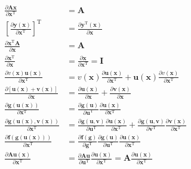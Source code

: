 \documentclass[UTF8,space=auto]{ctexart} %
\begin{document}
\begin{align}
\frac{\partial \mathbf{A} \mathbf{x}}{\partial \mathbf{x}^{\mathrm{T}}} &= \mathbf{A} \\
\left[\frac{\partial \mathbf{y}(\mathbf{x})}{\partial \mathbf{x}^{\mathrm{T}}}\right]^{\mathrm{T}} &= \frac{\partial \mathbf{y}^{\mathrm{T}}(\mathbf{x})}{\partial \mathbf{x}} \\
\frac{\partial \mathbf{x}^{\mathrm{T}} \mathbf{A}}{\partial \mathbf{x}} &= \mathbf{A} \\
\frac{\partial \mathbf{x}^{\mathrm{T}}}{\partial \mathbf{x}} &= \frac{\partial \mathbf{x}}{\partial \mathbf{x}^{\mathrm{T}}} = \mathbf{I} \\
\frac{\partial v(\mathbf{x}) \mathbf{u}(\mathbf{x})}{\partial \mathbf{x}^{\mathrm{T}}} &= v(\mathbf{x}) \frac{\partial \mathbf{u}(\mathbf{x})}{\partial \mathbf{x}^{\mathrm{T}}}+\mathbf{u}(\mathbf{x}) \frac{\partial v(\mathbf{x})}{\partial \mathbf{x}^{\mathrm{T}}} \\
\frac{ \partial \left[ \mathbf{u}(\mathbf{x})+\mathbf{v}(\mathbf{x}) \right] }{\partial \mathbf{x}} &= \frac{\partial \mathbf{u}(\mathbf{x})}{\partial \mathbf{x}}+\frac{\partial \mathbf{v}(\mathbf{x})}{\partial \mathbf{x}} \\
\frac{\partial \mathbf{g}(\mathbf{u}(\mathbf{x}))}{\partial \mathbf{x}^{\mathrm{T}}} &= \frac{\partial \mathbf{g}(\mathbf{u})}{\partial \mathbf{u}^{\mathrm{T}}} \frac{\partial \mathbf{u}(\mathbf{x})}{\partial \mathbf{x}^{\mathrm{T}}} \\
\frac{\partial \mathbf{g}(\mathbf{u}(\mathbf{x}), \mathbf{v}(\mathbf{x}))}{\partial \mathbf{x}^{\mathrm{T}}}&=\frac{\partial \mathbf{g}(\mathbf{u}, \mathbf{v})}{\partial \mathbf{u}^{\mathrm{T}}} \frac{\partial \mathbf{u}(\mathbf{x})}{\partial \mathbf{x}^{\mathrm{T}}}+\frac{\partial \mathbf{g}(\mathbf{u}, \mathbf{v})}{\partial \mathbf{v}^{\mathrm{T}}} \frac{\partial \mathbf{v}(\mathbf{x})}{\partial \mathbf{x}^{\mathrm{T}}} \\
\frac{\partial \bm{f}(\mathbf{g}(\mathbf{u}(\mathbf{x})))}{\partial \mathbf{x}^{\mathrm{T}}}&=\frac{\partial \bm{f}(\mathbf{g})}{\partial \mathbf{g}^{\mathrm{T}}} \frac{\partial \mathbf{g}(\mathbf{u})}{\partial \mathbf{u}^{\mathrm{T}}} \frac{\partial \mathbf{u}(\mathbf{x})}{\partial \mathbf{x}^{\mathrm{T}}} \\
\frac{\partial \mathbf{A} \mathbf{u}(\mathbf{x})}{\partial \mathbf{x}^{\mathrm{T}}}&=\frac{\partial \mathbf{A} \mathbf{u}}{\partial \mathbf{u}^{\mathrm{T}}} \frac{\partial \mathbf{u}(\mathbf{x})}{\partial \mathbf{x}^{\mathrm{T}}}=\mathbf{A} \frac{\partial \mathbf{u}(\mathbf{x})}{\partial \mathbf{x}^{\mathrm{T}}}
\end{align}
\end{document}
